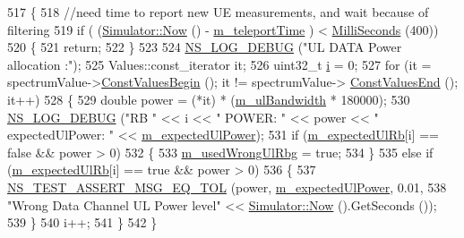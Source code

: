 \begin{DoxyCode}
517 \{
518   \textcolor{comment}{//need time to report new UE measurements, and wait because of filtering}
519   \textcolor{keywordflow}{if} ( (\hyperlink{group__simulator_gac3635e2e87f7ce316c89290ee1b01d0d}{Simulator::Now} () - \hyperlink{classLteFrAreaTestCase_a055d27717dd59f245a2ce57adcb8f201}{m\_teleportTime} ) < 
      \hyperlink{group__timecivil_gaf26127cf4571146b83a92ee18679c7a9}{MilliSeconds} (400))
520     \{
521       \textcolor{keywordflow}{return};
522     \}
523 
524   \hyperlink{group__logging_ga413f1886406d49f59a6a0a89b77b4d0a}{NS\_LOG\_DEBUG} (\textcolor{stringliteral}{"UL DATA Power allocation :"});
525   Values::const\_iterator it;
526   uint32\_t \hyperlink{bernuolliDistribution_8m_a6f6ccfcf58b31cb6412107d9d5281426}{i} = 0;
527   \textcolor{keywordflow}{for} (it = spectrumValue->\hyperlink{classns3_1_1SpectrumValue_aad6900431bd0554b3ba9a00691c2393b}{ConstValuesBegin} (); it != spectrumValue->
      \hyperlink{classns3_1_1SpectrumValue_ab5c2fbde4e06be7c0e4d7a0755c607be}{ConstValuesEnd} (); it++)
528     \{
529       \textcolor{keywordtype}{double} power =  (*it) * (\hyperlink{classLteFrAreaTestCase_afa54487d9f12658bbead39e1272f4d8c}{m\_ulBandwidth} * 180000);
530       \hyperlink{group__logging_ga413f1886406d49f59a6a0a89b77b4d0a}{NS\_LOG\_DEBUG} (\textcolor{stringliteral}{"RB "} << i << \textcolor{stringliteral}{" POWER: "} << power << \textcolor{stringliteral}{" expectedUlPower: "} << 
      \hyperlink{classLteFrAreaTestCase_a922e1db8b3366acf7163fd1a9f3108c5}{m\_expectedUlPower});
531       \textcolor{keywordflow}{if} (\hyperlink{classLteFrAreaTestCase_a60f609bb178ee3565a502f7e8fb34300}{m\_expectedUlRb}[i] == \textcolor{keyword}{false} && power > 0)
532         \{
533           \hyperlink{classLteFrAreaTestCase_a11e401119f17b78d6693ef29f82b8895}{m\_usedWrongUlRbg} = \textcolor{keyword}{true};
534         \}
535       \textcolor{keywordflow}{else} \textcolor{keywordflow}{if} (\hyperlink{classLteFrAreaTestCase_a60f609bb178ee3565a502f7e8fb34300}{m\_expectedUlRb}[i] == \textcolor{keyword}{true} && power > 0)
536         \{
537           \hyperlink{group__testing_ga9e7861b56b4e70db3b56044cb7a28e41}{NS\_TEST\_ASSERT\_MSG\_EQ\_TOL} (power, 
      \hyperlink{classLteFrAreaTestCase_a922e1db8b3366acf7163fd1a9f3108c5}{m\_expectedUlPower}, 0.01,
538                                      \textcolor{stringliteral}{"Wrong Data Channel UL Power level"} << 
      \hyperlink{group__simulator_gac3635e2e87f7ce316c89290ee1b01d0d}{Simulator::Now} ().GetSeconds ());
539         \}
540       i++;
541     \}
542 \}
\end{DoxyCode}


